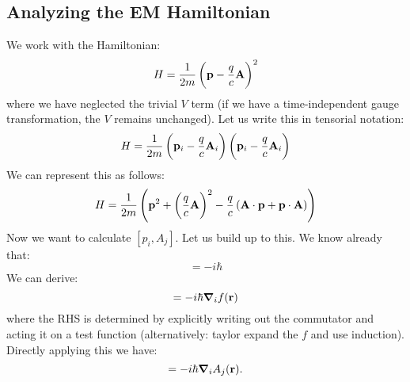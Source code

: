 \subsection{Analyzing the EM Hamiltonian}
We work with the Hamiltonian:
\begin{equation}
    H = \frac{1}{2m}\left(\mathbf{p} - \frac{q}{c}\mathbf{A}\right)^2
\end{equation}
where we have neglected the trivial $V$ term (if we have a time-independent gauge transformation, the $V$ remains unchanged). Let us write this in tensorial notation:
\begin{equation}
    H = \frac{1}{2m}\left(\mathbf{p}_i - \frac{q}{c}\mathbf{A}_i\right)\left(\mathbf{p}_i - \frac{q}{c}\mathbf{A}_i\right)
\end{equation}
We can represent this as follows:
\begin{equation}
    H = \frac{1}{2m}\left(\mathbf{p}^2 + \left(\frac{q}{c}\mathbf{A}\right)^2 - \frac{q}{c}\left(\mathbf{A} \cdot \mathbf{p} + \mathbf{p}\cdot\mathbf{A}\right)\right)
\end{equation}
Now we want to calculate $[p_i, A_j]$. Let us build up to this. We know already that:
\begin{equation}
    [p_x, x] = -i\hbar
\end{equation}
We can derive:
\begin{equation}
    [p_i, f(\v{r})] = -i\hbar \nabla_i f(\v{r})
\end{equation}
where the RHS is determined by explicitly writing out the commutator and acting it on a test function (alternatively: taylor expand the $f$ and use induction). Directly applying this we have:
\begin{equation}
    [p_i, A_j(\v{r})] = -i\hbar \nabla_i A_j(\v{r}).
\end{equation}

